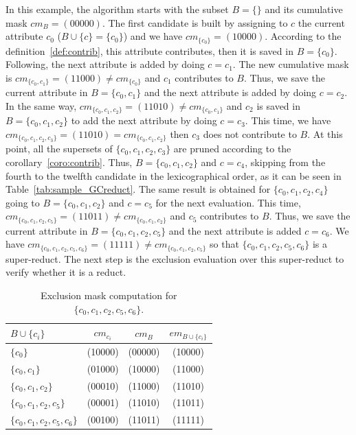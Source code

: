 \documentclass[number,preprint,review,12pt]{elsarticle}
\begin{document}
	\label{par:step}
	In this example, the algorithm starts with the subset $B=\lbrace \rbrace$ and its cumulative mask $cm_B=(00000)$. The first candidate is built by assigning to $c$ the current attribute  $c_0$ ($B\cup \lbrace c\rbrace = \lbrace c_0\rbrace$) and we have $cm_{\lbrace c_0\rbrace}=(10000)$. According to the definition~\ref{def:contrib}, this attribute contributes, then it is saved in $B=\lbrace c_0\rbrace$. Following, the next attribute is added  by doing $c = c_1$. The new cumulative mask is $cm_{\lbrace c_0,c_1\rbrace}=(11000)\neq cm_{\lbrace c_0\rbrace}$ and $c_1$ contributes to $B$. Thus, we save the current attribute in $B = \lbrace c_0,c_1\rbrace$ and the next attribute is added by doing $c = c_2$. In the same way, $cm_{\lbrace c_0,c_1,c_2\rbrace}=(11010)\neq cm_{\lbrace c_0,c_1\rbrace}$ and $c_2$ is saved in $B = \lbrace c_0,c_1,c_2\rbrace$ to add the next attribute by doing $c = c_3$. This time, we have $cm_{\lbrace c_0,c_1,c_2,c_3\rbrace}=(11010) = cm_{\lbrace c_0,c_1,c_2\rbrace}$ then $c_3$ does not contribute to $B$. At this point, all the supersets of $\lbrace c_0,c_1,c_2,c_3\rbrace$ are pruned according to the corollary~\ref{coro:contrib}. Thus, $B = \lbrace c_0,c_1,c_2\rbrace$ and $c = c_4$, skipping from the fourth to the twelfth candidate in the lexicographical order, as it can be seen in  Table~\ref{tab:sample_GCreduct}. The same result is obtained for $\lbrace c_0,c_1,c_2,c_4\rbrace$ going to $B = \lbrace c_0,c_1,c_2\rbrace$ and $c = c_5$ for the next evaluation. This time, $cm_{\lbrace c_0,c_1,c_2,c_5\rbrace}=(11011)\neq cm_{\lbrace c_0,c_1,c_2\rbrace}$ and $c_5$ contributes to $B$. Thus, we save the current attribute in $B = \lbrace c_0,c_1,c_2,c_5\rbrace$ and the next attribute is added $c = c_6$. We have $cm_{\lbrace c_0,c_1,c_2,c_5,c_6\rbrace}=(11111)\neq cm_{\lbrace c_0,c_1,c_2,c_5\rbrace}$ so that $\lbrace c_0,c_1,c_2,c_5,c_6\rbrace$ is a super-reduct. The next step is the exclusion evaluation over this super-reduct to verify whether it is a reduct.
	
	\begin{table}[!htb]
		\caption{Exclusion mask computation for $\lbrace c_0,c_1,c_2,c_5,c_6\rbrace$.}\label{tab:em}
		\centering 
		\begin{tabular}{|l|c|c|c|}
			\hline
			$B\cup \lbrace c_i\rbrace$                          & $cm_{c_i}$ & $cm_B$  & $em_{B\cup \lbrace c_i\rbrace}$ \\
			\hline
			$\lbrace c_0\rbrace$                 & (10000)    & (00000) & (10000)          \\
			$\lbrace c_0,c_1\rbrace$             & (01000)    & (10000) & (11000)          \\
			$\lbrace c_0,c_1,c_2\rbrace$         & (00010)    & (11000) & (11010)          \\
			$\lbrace c_0,c_1,c_2,c_5\rbrace$     & (00001)    & (11010) & (11011)          \\
			$\lbrace c_0,c_1,c_2,c_5,c_6\rbrace$ & (00100)    & (11011) & (11111)          \\
			\hline
		\end{tabular}
	\end{table}
	
\end{document}
